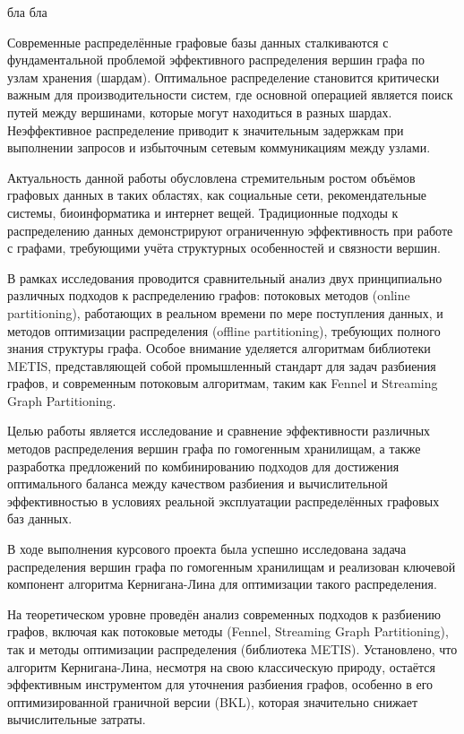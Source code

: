 \documentclass[a4paper, 14pt]{extarticle}
\begin{document}

\pagebreak
бла бла
\newpage
\tableofcontents
\newpage
{}

\indent Современные распределённые графовые базы данных сталкиваются с фундаментальной проблемой эффективного распределения вершин графа по узлам хранения (шардам). Оптимальное распределение становится критически важным для производительности систем, где основной операцией является поиск путей между вершинами, которые могут находиться в разных шардах. Неэффективное распределение приводит к значительным задержкам при выполнении запросов и избыточным сетевым коммуникациям между узлами.

Актуальность данной работы обусловлена стремительным ростом объёмов графовых данных в таких областях, как социальные сети, рекомендательные системы, биоинформатика и интернет вещей. Традиционные подходы к распределению данных демонстрируют ограниченную эффективность при работе с графами, требующими учёта структурных особенностей и связности вершин.

В рамках исследования проводится сравнительный анализ двух принципиально различных подходов к распределению графов: потоковых методов (online partitioning), работающих в реальном времени по мере поступления данных, и методов оптимизации распределения (offline partitioning), требующих полного знания структуры графа. Особое внимание уделяется алгоритмам библиотеки METIS, представляющей собой промышленный стандарт для задач разбиения графов, и современным потоковым алгоритмам, таким как Fennel и Streaming Graph Partitioning.

Целью работы является исследование и сравнение эффективности различных методов распределения вершин графа по гомогенным хранилищам, а также разработка предложений по комбинированию подходов для достижения оптимального баланса между качеством разбиения и вычислительной эффективностью в условиях реальной эксплуатации распределённых графовых баз данных.
\newpage

\newpage
{}

В ходе выполнения курсового проекта была успешно исследована задача распределения вершин графа по гомогенным хранилищам и реализован ключевой компонент алгоритма Кернигана-Лина для оптимизации такого распределения.

На теоретическом уровне проведён анализ современных подходов к разбиению графов, включая как потоковые методы (Fennel, Streaming Graph Partitioning), так и методы оптимизации распределения (библиотека METIS). Установлено, что алгоритм Кернигана-Лина, несмотря на свою классическую природу, остаётся эффективным инструментом для уточнения разбиения графов, особенно в его оптимизированной граничной версии (BKL), которая значительно снижает вычислительные затраты.
\end{document}
